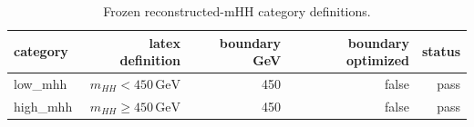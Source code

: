 \begin{table}[htbp]
\centering
\small
\caption{Frozen reconstructed-mHH category definitions.}
\label{tab:hh4b\_bdt\_v2\_category\_definitions}
\begin{tabular}{lrrrr}
\toprule
category & latex definition & boundary GeV & boundary optimized & status \\
\midrule
low\_mhh & $m_{HH}<450\,\mathrm{GeV}$ & 450 & false & pass \\
high\_mhh & $m_{HH}\geq450\,\mathrm{GeV}$ & 450 & false & pass \\
\bottomrule
\end{tabular}
\end{table}
